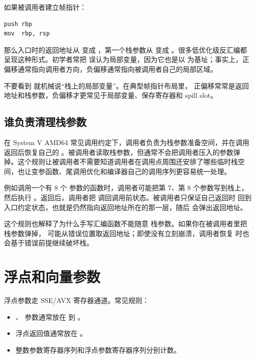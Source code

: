 如果被调用者建立帧指针：

\begin{lstlisting}
push rbp
mov  rbp, rsp
\end{lstlisting}

那么入口时的返回地址从 \code{[rsp]} 变成 \code{[rbp + 8]}，第一个栈参数从 \code{[rsp + 8]} 变成 \code{[rbp + 16]}。很多低优化级反汇编都呈现这种形式。初学者常把 \code{[rbp + 16]} 误认为局部变量，因为它也是以  为基址；事实上，正偏移通常指向调用者方向，负偏移通常指向被调用者自己的局部区域。

\begin{warningbox}
不要看到 \code{[rbp + 16]} 就机械说“栈上的局部变量”。在典型帧指针布局里， 正偏移常常是返回地址和栈参数，负偏移才更常见于局部变量、保存寄存器和 spill slot。
\end{warningbox}

\subsection{谁负责清理栈参数}

在 System V AMD64 常见调用约定下，调用者负责为栈参数准备空间，并在调用返回后恢复自己的 。被调用者读取栈参数，但通常不会把调用者压入的参数弹掉。这个规则让被调用者不需要知道调用者在调用点周围还安排了哪些临时栈空间，也让变参函数、尾调用优化和编译器自己的调用序列更容易统一处理。

例如调用一个有 8 个  参数的函数时，调用者可能把第 7、第 8 个参数写到栈上，然后执行 。返回后，调用者把  调回调用前状态。被调用者只保证自己返回时  回到入口约定状态，也就是仍然指向返回地址所在的那一层，随后  会弹出返回地址。

这个规则也解释了为什么手写汇编函数不能随意  栈参数。如果你在被调用者里把栈参数弹掉， 可能从错误位置取返回地址；即使没有立刻崩溃，调用者恢复  时也会基于错误前提继续破坏栈。

\section{浮点和向量参数}

浮点参数走 SSE/AVX 寄存器通道。常见规则：

\begin{itemize}
  \item {}、 参数通常放在  到 。
  \item 浮点返回值通常放在 。
  \item 整数参数寄存器序列和浮点参数寄存器序列分别计数。
\end{itemize}

